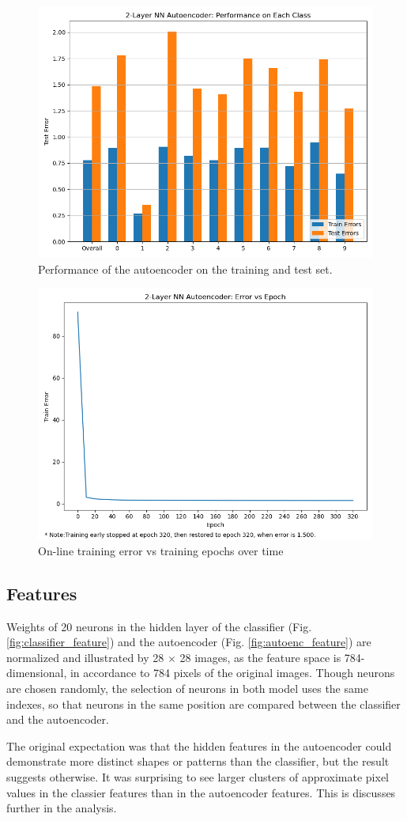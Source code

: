 \documentclass[11pt,titlepage]{article}
\begin{document}
\begin{figure}[htb]
	\centering
	\includegraphics[width=0.6\linewidth]{img/h3p2_test}
	\caption{Performance of the autoencoder on the training and test set.}
	\label{fig:autoenc_test}
\end{figure}

\begin{figure}[htb]
	\centering
	\includegraphics[width=0.6\linewidth]{img/h3p2_train}
	\caption{On-line training error vs training epochs over time}
	\label{fig:autoenc_train}
\end{figure}

\subsection{Features}

Weights of 20 neurons in the hidden layer of the classifier (Fig. \ref{fig:classifier_feature}) and the autoencoder (Fig. \ref{fig:autoenc_feature}) are normalized and illustrated by 28 $\times$ 28 images, as the feature space is 784-dimensional, in accordance to 784 pixels of the original images. Though neurons are chosen randomly, the selection of neurons in both model uses the same indexes, so that neurons in the same position are compared between the classifier and the autoencoder.

The original expectation was that the hidden features in the autoencoder could demonstrate more distinct shapes or patterns than the classifier, but the result suggests otherwise. It was surprising to see larger clusters of approximate pixel values in the classier features than in the autoencoder features. This is discusses further in the analysis.
\end{document}
